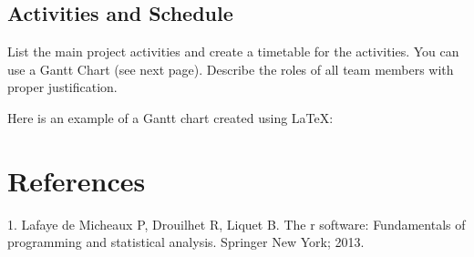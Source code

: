 \documentclass[mstat,12pt]{unswthesis}
\newenvironment{CSLReferences}%
  {}%
  {\par}
\begin{document}
\hypertarget{activities-and-schedule}{%
\section{Activities and Schedule}\label{activities-and-schedule}}

List the main project activities and create a timetable for the
activities. You can use a Gantt Chart (see next page). Describe the
roles of all team members with proper justification.

\newpage

Here is an example of a Gantt chart created using \LaTeX:

\bigskip

\hypertarget{references}{%
\chapter*{References}\label{references}}




\hypertarget{refs}{}
\begin{CSLReferences}{0}{0}
\leavevmode{}%
1. Lafaye de Micheaux P, Drouilhet R, Liquet B. The r software:
Fundamentals of programming and statistical analysis. Springer New York;
2013.

\end{CSLReferences}
\end{document}
